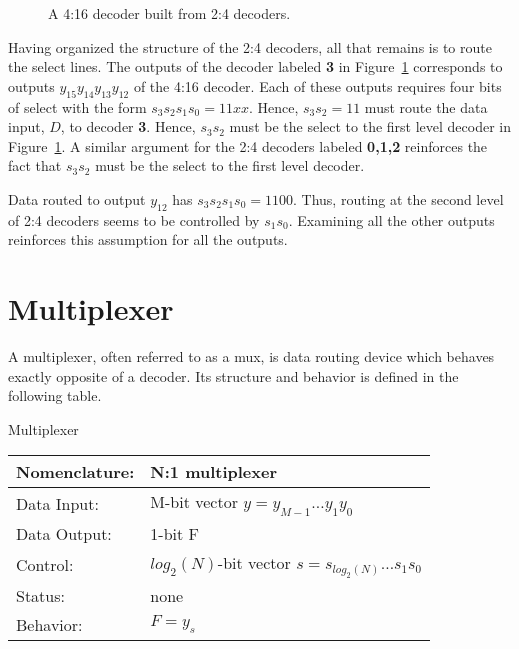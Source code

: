 \begin{figure}[ht]
\caption{A 4:16 decoder built from 2:4 decoders.} 
\label{fig:comboBBBigDecoder}
\end{figure}

Having organized the structure of the 2:4 decoders, all that remains 
is to route the select lines.  The outputs of the decoder labeled 
\textbf{ 3} in Figure~\ref{fig:comboBBBigDecoder} corresponds to outputs 
$y_{15} y_{14} y_{13} y_{12}$ 
of the 4:16 decoder.  Each of these outputs requires four bits of 
select with the form $s_3 s_2 s_1 s_0 = 11xx$.  Hence, $s_3 s_2 = 11$ 
must route the data input, $D$, to decoder \textbf{ 3}.  Hence, $s_3 s_2$ 
must be the select to the first level decoder in 
Figure~\ref{fig:comboBBBigDecoder}.   A similar argument for the 2:4 decoders 
labeled \textbf{ 0,1,2} reinforces the fact that $s_3 s_2$ must be the select 
to the first level decoder.  

Data routed to output $y_{12}$ has $s_3 s_2 s_1 s_0 = 1100$.  Thus, routing
at the second level of 2:4 decoders seems to be controlled by $s_1 s_0$.
Examining all the other outputs reinforces this assumption for all
the outputs.


\section{Multiplexer}
A multiplexer, often referred to as a mux, is data routing device 
which behaves exactly opposite of a decoder.  Its structure and
behavior is defined in the following table.

\begin{buildingblock}{Multiplexer}
\label{buildingblock:multiplexer}
\begin{tabular}{|l|p{3.5in}|} \hline
Nomenclature:  & N:1 multiplexer                        \\ \hline
Data Input:    & M-bit vector $y=y_{M-1} \ldots y_1 y_0$    \\ \hline
Data Output:   & 1-bit F          \\ \hline
Control:       & $log_2(N)$-bit vector $s = s_{log_2(N)} \ldots s_1 s_0$	\\ \hline
Status:        & none                                   \\ \hline
Behavior:      & $F = y_s$				\\ \hline
\end{tabular}
\label{page:mux}
\end{buildingblock}

